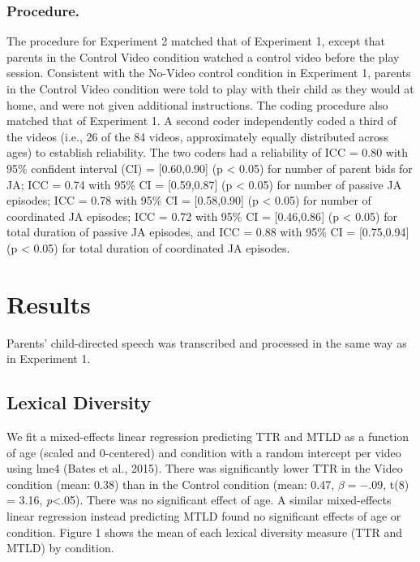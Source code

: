 \documentclass[10pt, letterpaper]{article}
\begin{document}
\subsubsection{Procedure.}\label{procedure.-1}

The procedure for Experiment 2 matched that of Experiment 1, except that
parents in the Control Video condition watched a control video before
the play session. Consistent with the No-Video control condition in
Experiment 1, parents in the Control Video condition were told to play
with their child as they would at home, and were not given additional
instructions. The coding procedure also matched that of Experiment 1. A
second coder independently coded a third of the videos (i.e., 26 of the
84 videos, approximately equally distributed across ages) to establish
reliability. The two coders had a reliability of ICC = 0.80 with 95\%
confident interval (CI) = {[}0.60,0.90{]} (p \textless{} 0.05) for
number of parent bids for JA; ICC = 0.74 with 95\% CI = {[}0.59,0.87{]}
(p \textless{} 0.05) for number of passive JA episodes; ICC = 0.78 with
95\% CI = {[}0.58,0.90{]} (p \textless{} 0.05) for number of coordinated
JA episodes; ICC = 0.72 with 95\% CI = {[}0.46,0.86{]} (p \textless{}
0.05) for total duration of passive JA episodes, and ICC = 0.88 with
95\% CI = {[}0.75,0.94{]} (p \textless{} 0.05) for total duration of
coordinated JA episodes.

\section{Results}\label{results-1}

Parents' child-directed speech was transcribed and processed in the same
way as in Experiment 1.

\subsection{Lexical Diversity}\label{lexical-diversity-1}

We fit a mixed-effects linear regression predicting TTR and MTLD as a
function of age (scaled and 0-centered) and condition with a random
intercept per video using lme4 (Bates et al., 2015). There was
significantly lower TTR in the Video condition (mean: 0.38) than in the
Control condition (mean: 0.47, \(\beta=-.09\), t(8) = 3.16,
\emph{p}\textless{}.05). There was no significant effect of age. A
similar mixed-effects linear regression instead predicting MTLD found no
significant effects of age or condition. Figure 1 shows the mean of each
lexical diversity measure (TTR and MTLD) by condition.
\end{document}
